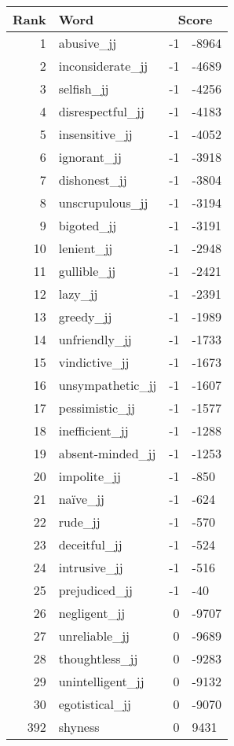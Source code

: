 \begin{longtable}[!htbp]{| rlr@{.}l |}
    \hline
    \textbf{Rank} & \textbf{Word} & \multicolumn{2}{c|}{\textbf{Score}} \\
    \hline
    \endhead
    1 & abusive\_jj & -1 & -8964 \\
    2 & inconsiderate\_jj & -1 & -4689 \\
    3 & selfish\_jj & -1 & -4256 \\
    4 & disrespectful\_jj & -1 & -4183 \\
    5 & insensitive\_jj & -1 & -4052 \\
    6 & ignorant\_jj & -1 & -3918 \\
    7 & dishonest\_jj & -1 & -3804 \\
    8 & unscrupulous\_jj & -1 & -3194 \\
    9 & bigoted\_jj & -1 & -3191 \\
    10 & lenient\_jj & -1 & -2948 \\
    11 & gullible\_jj & -1 & -2421 \\
    12 & lazy\_jj & -1 & -2391 \\
    13 & greedy\_jj & -1 & -1989 \\
    14 & unfriendly\_jj & -1 & -1733 \\
    15 & vindictive\_jj & -1 & -1673 \\
    16 & unsympathetic\_jj & -1 & -1607 \\
    17 & pessimistic\_jj & -1 & -1577 \\
    18 & inefficient\_jj & -1 & -1288 \\
    19 & absent-minded\_jj & -1 & -1253 \\
    20 & impolite\_jj & -1 & -850 \\
    21 & naïve\_jj & -1 & -624 \\
    22 & rude\_jj & -1 & -570 \\
    23 & deceitful\_jj & -1 & -524 \\
    24 & intrusive\_jj & -1 & -516 \\
    25 & prejudiced\_jj & -1 & -40 \\
    26 & negligent\_jj & 0 & -9707 \\
    27 & unreliable\_jj & 0 & -9689 \\
    28 & thoughtless\_jj & 0 & -9283 \\
    29 & unintelligent\_jj & 0 & -9132 \\
    30 & egotistical\_jj & 0 & -9070 \\
    392 & shyness & 0 & 9431 \\

\end{longtable}
